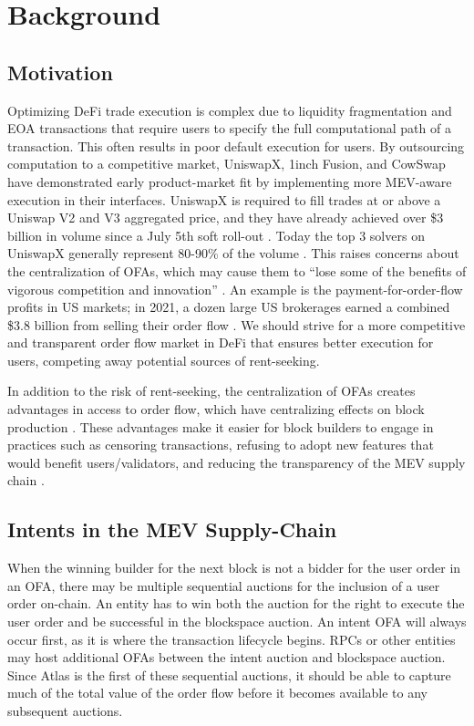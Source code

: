 \documentclass{article}
\begin{document}
\section{Background}

\subsection{Motivation}

Optimizing DeFi trade execution is complex due to liquidity fragmentation and EOA transactions that require users to specify the full computational path of a transaction. This often results in poor default execution for users. By outsourcing computation to a competitive market, UniswapX, 1inch Fusion, and CowSwap have demonstrated early product-market fit by implementing more MEV-aware execution in their interfaces. UniswapX is required to fill trades at or above a Uniswap V2 and V3 aggregated price, and they have already achieved over \$3 billion in volume since a July 5th soft roll-out \cite{uniswapx}. Today the top 3 solvers on UniswapX generally represent 80-90\% of the volume \cite{uniswapx}. This raises concerns about the centralization of OFAs, which may cause them to “lose some of the benefits of vigorous competition and innovation” \cite{sec}. An example is the payment-for-order-flow profits in US markets; in 2021, a dozen large US brokerages earned a combined \$3.8 billion from selling their order flow \cite{fn}. We should strive for a more competitive and transparent order flow market in DeFi that ensures better execution for users, competing away potential sources of rent-seeking. 

In addition to the risk of rent-seeking, the centralization of OFAs creates advantages in access to order flow, which have centralizing effects on block production \cite{ofa}. These advantages make it easier for block builders to engage in practices such as censoring transactions, refusing to adopt new features that would benefit users/validators, and reducing the transparency of the MEV supply chain \cite{block}.

\subsection{Intents in the MEV Supply-Chain}

When the winning builder for the next block is not a bidder for the user order in an OFA, there may be multiple sequential auctions for the inclusion of a user order on-chain. An entity has to win both the auction for the right to execute the user order and be successful in the blockspace auction. An intent OFA will always occur first, as it is where the transaction lifecycle begins. RPCs or other entities may host additional OFAs between the intent auction and blockspace auction. Since Atlas is the first of these sequential auctions, it should be able to capture much of the total value of the order flow before it becomes available to any subsequent auctions.
\end{document}

